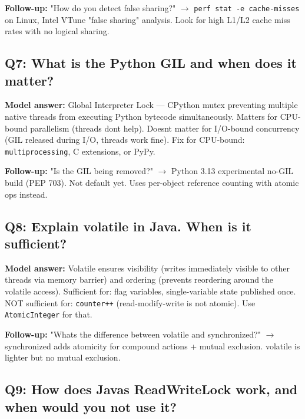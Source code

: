 \documentclass[11pt]{article}
\begin{document}
\textbf{Follow-up:} "How do you detect false sharing?" \(\rightarrow\) \texttt{perf\ stat\ -e\ cache-misses} on Linux, Intel VTune "false sharing" analysis. Look for high L1/L2 cache miss rates with no logical sharing.

\subsection{Q7: What is the Python GIL and when does it matter?}\label{q7-what-is-the-python-gil-and-when-does-it-matter}

\textbf{Model answer:} Global Interpreter Lock --- CPython mutex preventing multiple native threads from executing Python bytecode simultaneously. Matters for CPU-bound parallelism (threads don\textquotesingle t help). Doesn\textquotesingle t matter for I/O-bound concurrency (GIL released during I/O, threads work fine). Fix for CPU-bound: \texttt{multiprocessing}, C extensions, or PyPy.

\textbf{Follow-up:} "Is the GIL being removed?" \(\rightarrow\) Python 3.13 experimental no-GIL build (PEP 703). Not default yet. Uses per-object reference counting with atomic ops instead.

\subsection{Q8: Explain volatile in Java. When is it sufficient?}\label{q8-explain-volatile-in-java-when-is-it-sufficient}

\textbf{Model answer:} Volatile ensures visibility (writes immediately visible to other threads via memory barrier) and ordering (prevents reordering around the volatile access). Sufficient for: flag variables, single-variable state published once. NOT sufficient for: \texttt{counter++} (read-modify-write is not atomic). Use \texttt{AtomicInteger} for that.

\textbf{Follow-up:} "What\textquotesingle s the difference between volatile and synchronized?" \(\rightarrow\) synchronized adds atomicity for compound actions + mutual exclusion. volatile is lighter but no mutual exclusion.

\subsection{Q9: How does Java\textquotesingle s ReadWriteLock work, and when would you not use it?}\label{q9-how-does-javas-readwritelock-work-and-when-would-you-not-use-it}
\end{document}

